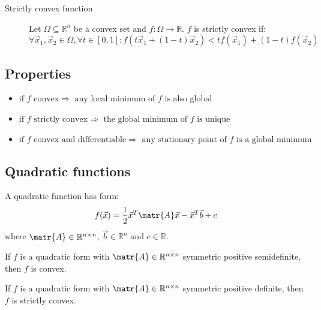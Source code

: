 \begin{description}
    \item[Strictly convex function] 
        Let $\Omega \subseteq \mathbb{R}^n$ be a convex set and $f: \Omega \rightarrow \mathbb{R}$.
        $f$ is strictly convex if:
        \[ 
            \forall \vec{x}_1, \vec{x}_2 \in \Omega, \forall t \in [0, 1]: 
                f(t\vec{x}_1 + (1-t)\vec{x}_2) < t f(\vec{x}_1) + (1-t) f(\vec{x}_2)
        \]
\end{description}


\subsection{Properties}
\begin{itemize}
    \item $\text{if } f \text{ convex} \Rightarrow \text{ any local minimum of } f \text{ is also global}$
    \item $\text{if } f \text{ strictly convex} \Rightarrow \text{ the global minimum of } f \text{ is unique}$
    \item $\text{if } f \text{ convex and differentiable} \Rightarrow \text{ any stationary point of } f \text{ is a global minimum}$
\end{itemize}


\subsection{Quadratic functions}
A quadratic function has form:
\[ f(\vec{x}) = \frac{1}{2}\vec{x}^T\matr{A}\vec{x} - \vec{x}^T\vec{b} + c \]
where $\matr{A} \in \mathbb{R}^{n \times n}$, $\vec{b} \in \mathbb{R}^n$ and $c \in \mathbb{R}$.

\begin{theorem}
    If $f$ is a quadratic form with $\matr{A} \in \mathbb{R}^{n \times n}$ symmetric positive semidefinite,
    then $f$ is convex.
\end{theorem}

\begin{theorem}
    If $f$ is a quadratic form with $\matr{A} \in \mathbb{R}^{n \times n}$ symmetric positive definite,
    then $f$ is strictly convex.
\end{theorem}

